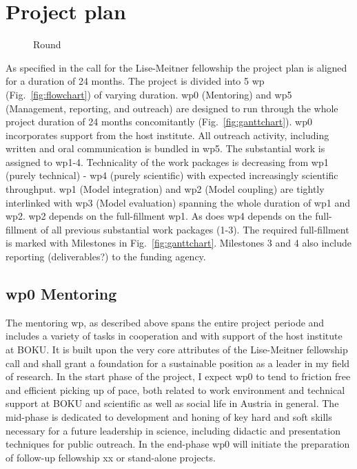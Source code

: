 \section*{Project plan}
\label{sec:project_plan}

\begin{figure}
  \centering
  \caption{Round}
\end{figure}

As specified in the call for the Lise-Meitner fellowship the project plan is aligned for a duration of 24 months. The project is divided into 5 \gls{wp} (Fig.~\ref{fig:flowchart}) of varying duration. \gls{wp}0 (Mentoring) and \gls{wp}5 (Management, reporting, and outreach) are designed to run through the whole project duration of 24 months concomitantly (Fig.~\ref{fig:ganttchart}). \gls{wp}0 incorporates support from the host institute. All outreach activity, including written and oral communication  is bundled in \gls{wp}5. The substantial work is assigned to \gls{wp}1-4. Technicality of the work packages is decreasing from \gls{wp}1 (purely technical) - \gls{wp}4 (purely scientific) with expected increasingly scientific throughput. \gls{wp}1 (Model integration) and \gls{wp}2 (Model coupling) are tightly interlinked with \gls{wp}3 (Model evaluation) spanning the whole duration of \gls{wp}1 and \gls{wp}2. \gls{wp}2 depends on the full-fillment \gls{wp}1. As does \gls{wp}4 depends on the full-fillment of all previous substantial work packages (1-3). The required full-fillment is marked with Milestones in Fig.~\ref{fig:ganttchart}. Milestones 3 and 4 also include reporting (deliverables?) to the funding agency.
 
\subsection*{\gls{wp}0 Mentoring}
\label{ssec:wp0}
The mentoring \gls{wp}, as described above spans the entire project periode and includes a variety of tasks in cooperation and with support of the host institute at BOKU. It is built upon the very core attributes of the Lise-Meitner fellowship call and shall grant a foundation for a sustainable position as a leader in my field of research. In the start phase of the project, I expect \gls{wp}0 to tend to friction free and efficient picking up of pace, both related to work environment and technical support at BOKU and scientific as well as social life in Austria in general. The mid-phase is dedicated to development and honing of key hard and soft skills necessary for a future leadership in science, including didactic and presentation techniques for public outreach. In the end-phase \gls{wp}0 will initiate the preparation of follow-up fellowship xx or stand-alone projects.\\


